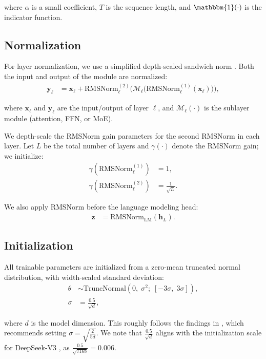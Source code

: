 \documentclass{article}
\begin{document}
where $\alpha$ is a small coefficient, $T$ is the sequence length, and $\mathbbm{1}(\cdot)$ is the indicator function.


\subsection{Normalization}
For layer normalization, we use a simplified depth-scaled sandwich norm \citep{yin2025panguultrapushinglimits, ding2021cogviewmasteringtexttoimagegeneration, kim2025perilnrevisitingnormalizationlayer}. Both the input and output of the module are normalized:
\begin{align}
\mathbf{y}_\ell
&=
\mathbf{x}_\ell
+
\mathrm{RMSNorm}^{(2)}_\ell\!\Big(
\mathcal{M}_\ell\big(
\mathrm{RMSNorm}^{(1)}_\ell(\mathbf{x}_\ell)
\big)
\Big),
\tag{33}
\end{align}

where $\mathbf{x}_\ell$ and $\mathbf{y}_\ell$ are the input/output of layer $\ell$, and $\mathcal{M}_\ell(\cdot)$ is the sublayer module (attention, FFN, or MoE).

We depth-scale the RMSNorm gain parameters for the second RMSNorm in each layer.
Let $L$ be the total number of layers and $\gamma(\cdot)$ denote the RMSNorm gain; we initialize:
\begin{align}
\gamma\!\left(\mathrm{RMSNorm}^{(1)}_\ell\right)
&=
1,
\tag{34}\\
\gamma\!\left(\mathrm{RMSNorm}^{(2)}_\ell\right)
&=
\frac{1}{\sqrt{L}}.
\tag{35}
\end{align}

We also apply RMSNorm before the language modeling head:
\begin{align}
\mathbf{z}
&=
\mathrm{RMSNorm}_{\mathrm{LM}}(\mathbf{h}_L).
\tag{36}
\end{align}

\subsection{Initialization}
All trainable parameters are initialized from a zero-mean truncated normal distribution, with width-scaled standard deviation:
\begin{align}
\theta &\sim \mathrm{TruncNormal}\!\left(0,\;\sigma^2;\;[-3\sigma,\;3\sigma]\right),
\tag{37}\\
\sigma &= \frac{0.5}{\sqrt{d}},
\tag{38}
\end{align}

where $d$ is the model dimension. This roughly follows the findings in \cite{takase2025spikemorestabilizingpretraining}, which recommends setting $\sigma = \sqrt{\frac{2}{5d}}$. We note that $\frac{0.5}{\sqrt{d}}$ aligns with the initialization scale for DeepSeek-V3 \citep{deepseekai2025deepseekv3technicalreport}, as $\frac{0.5}{\sqrt{7168}}=0.006$.
\end{document}

